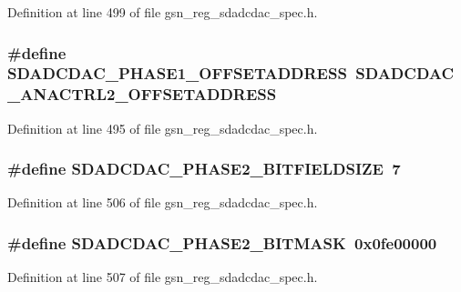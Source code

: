 Definition at line 499 of file gsn\_\-reg\_\-sdadcdac\_\-spec.h.

\hypertarget{a00569_ac47743c5518db42ca7f228edec61e831}{
\subsubsection[{SDADCDAC\_\-PHASE1\_\-OFFSETADDRESS}]{\setlength{\rightskip}{0pt plus 5cm}\#define SDADCDAC\_\-PHASE1\_\-OFFSETADDRESS~SDADCDAC\_\-ANACTRL2\_\-OFFSETADDRESS}}
\label{a00569_ac47743c5518db42ca7f228edec61e831}


Definition at line 495 of file gsn\_\-reg\_\-sdadcdac\_\-spec.h.

\hypertarget{a00569_a09f0f6d05f3f6acbb540b64317361e4a}{
\subsubsection[{SDADCDAC\_\-PHASE2\_\-BITFIELDSIZE}]{\setlength{\rightskip}{0pt plus 5cm}\#define SDADCDAC\_\-PHASE2\_\-BITFIELDSIZE~7}}
\label{a00569_a09f0f6d05f3f6acbb540b64317361e4a}


Definition at line 506 of file gsn\_\-reg\_\-sdadcdac\_\-spec.h.

\hypertarget{a00569_acee6c5c6d17d616fb1b055f32d7ee53b}{
\subsubsection[{SDADCDAC\_\-PHASE2\_\-BITMASK}]{\setlength{\rightskip}{0pt plus 5cm}\#define SDADCDAC\_\-PHASE2\_\-BITMASK~0x0fe00000}}
\label{a00569_acee6c5c6d17d616fb1b055f32d7ee53b}


Definition at line 507 of file gsn\_\-reg\_\-sdadcdac\_\-spec.h.

